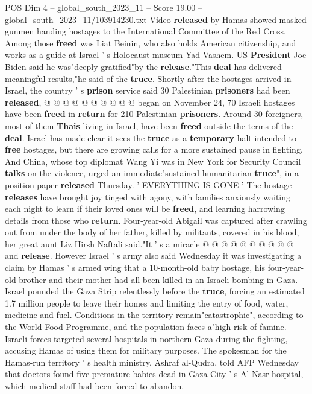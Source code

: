 \begin{textsample}{POS Dim 4 – global\_south\_2023\_11 – Score 19.00 – global\_south\_2023\_11/103914230.txt}
Video \textbf{released} by Hamas showed masked gunmen handing hostages to the International Committee of the Red Cross.
Among those \textbf{freed} was Liat Beinin, who also holds American citizenship, and works as a guide at Israel ' s Holocaust museum Yad Vashem.
US \textbf{President} Joe Biden said he was"deeply gratified"by the \textbf{release}."This \textbf{deal} has delivered meaningful results,"he said of the \textbf{truce}.
Shortly after the hostages arrived in Israel, the country ' s \textbf{prison} service said 30 Palestinian \textbf{prisoners} had been \textbf{released}, @ @ @ @ @ @ @ @ @ @ began on November 24, 70 Israeli hostages have been \textbf{freed} in \textbf{return} for 210 Palestinian \textbf{prisoners}.
Around 30 foreigners, most of them \textbf{Thais} living in Israel, have been \textbf{freed} outside the terms of the \textbf{deal}.
Israel has made clear it sees the \textbf{truce} as a \textbf{temporary} halt intended to \textbf{free} hostages, but there are growing calls for a more sustained pause in fighting.
And China, whose top diplomat Wang Yi was in New York for Security Council \textbf{talks} on the violence, urged an immediate"sustained humanitarian \textbf{truce}", in a position paper \textbf{released} Thursday. ' EVERYTHING IS GONE ' The hostage \textbf{releases} have brought joy tinged with agony, with families anxiously waiting each night to learn if their loved ones will be \textbf{freed}, and learning harrowing details from those who \textbf{return}.
Four-year-old Abigail was captured after crawling out from under the body of her father, killed by militants, covered in his blood, her great aunt Liz Hirsh Naftali said."It ' s a miracle @ @ @ @ @ @ @ @ @ @ and \textbf{release}.
However Israel ' s army also said Wednesday it was investigating a claim by Hamas ' s armed wing that a 10-month-old baby hostage, his four-year-old brother and their mother had all been killed in an Israeli bombing in Gaza.
Israel pounded the Gaza Strip relentlessly before the \textbf{truce}, forcing an estimated 1.7 million people to leave their homes and limiting the entry of food, water, medicine and fuel.
Conditions in the territory remain"catastrophic", according to the World Food Programme, and the population faces a"high risk of famine.
Israeli forces targeted several hospitals in northern Gaza during the fighting, accusing Hamas of using them for military purposes.
The spokesman for the Hamas-run territory ' s health ministry, Ashraf al-Qudra, told AFP Wednesday that doctors found five premature babies dead in Gaza City ' s Al-Nasr hospital, which medical staff had been forced to abandon.

\end{textsample}
